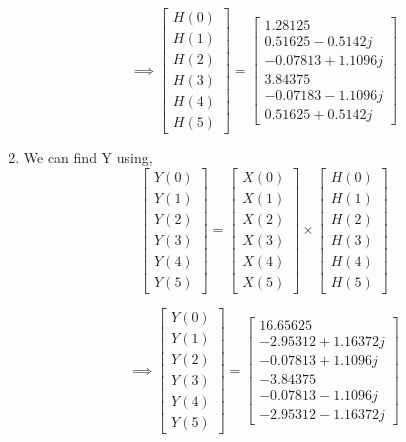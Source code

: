 \documentclass[journal,12pt,twocolumn]{IEEEtran}
\renewcommand\thesection{\arabic{section}}
\begin{document}
\begin{enumerate}[label=\thesection.\arabic*.,ref=\thesection.\theenumi]
\begin{equation}
\implies
\begin{bmatrix} 
H(0) \\ 
H(1) \\ 
H(2) \\ 
H(3) \\ 
H(4) \\ 
H(5) 
\end{bmatrix}
=
\begin{bmatrix}
1.28125 \\
0.51625-0.5142j \\ 
-0.07813+1.1096j  \\ 
3.84375 \\ 
-0.07183-1.1096j \\ 
0.51625+0.5142j
\end{bmatrix}
\end{equation}

\item
We can find Y using,
\begin{equation}
\begin{bmatrix} 
Y(0) \\ 
Y(1) \\ 
Y(2) \\ 
Y(3) \\ 
Y(4) \\ 
Y(5) 
\end{bmatrix}
=
\begin{bmatrix} 
X(0) \\ 
X(1) \\ 
X(2) \\ 
X(3) \\ 
X(4) \\ 
X(5) 
\end{bmatrix}
\times
\begin{bmatrix} 
H(0) \\ 
H(1) \\ 
H(2) \\ 
H(3) \\ 
H(4) \\ 
H(5) 
\end{bmatrix}
\end{equation}

\begin{equation}
\implies
\begin{bmatrix} 
Y(0) \\ 
Y(1) \\ 
Y(2) \\ 
Y(3) \\ 
Y(4) \\ 
Y(5) 
\end{bmatrix}
=
\begin{bmatrix}
16.65625\\ 
-2.95312+1.16372j \\ 
-0.07813+1.1096j \\ 
-3.84375\\ 
-0.07813-1.1096j \\ 
-2.95312-1.16372j 
\end{bmatrix}
\end{equation}


\end{enumerate}
\end{document}
